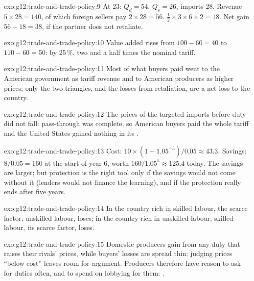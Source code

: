 \begin{solution}{exo:g12:trade-and-trade-policy:9}
At 23: $Q_d = 54$, $Q_s = 26$, imports 28. Revenue $5 \times 28 = 140$, of which foreign sellers pay $2 \times 28 = 56$.  $\tfrac12 \times 3 \times 6 \times 2 = 18$.
Net gain $56 - 18 = 38$, if the partner does not retaliate.
\end{solution}

\begin{solution}{exo:g12:trade-and-trade-policy:10}
Value added rises from $100 - 60 = 40$ to $110 - 60 = 50$: by 25\,\%, two and a half times the nominal tariff.
\end{solution}

\begin{solution}{exo:g12:trade-and-trade-policy:11}
Most of what buyers paid went to the American government as tariff revenue and to American producers as higher prices; only the two triangles, and the losses from
retaliation, are a net loss to the country.
\end{solution}

\begin{solution}{exo:g12:trade-and-trade-policy:12}
The prices of the targeted imports before duty did not fall: pass-through was complete, so American buyers paid the whole tariff and the United States gained nothing in its
.
\end{solution}

\begin{solution}{exo:g12:trade-and-trade-policy:13}
Cost: $10 \times (1 - 1.05^{-5})/0.05 \approx 43.3$. Savings: $8/0.05 = 160$ at the start of year 6, worth $160/1.05^5 \approx 125.4$ today. The savings are larger; but protection is the
right tool only if the savings would not come without it (lenders would not finance the learning), and if the protection really ends after five years.
\end{solution}

\begin{solution}{exo:g12:trade-and-trade-policy:14}
In the country rich in skilled labour, the scarce factor, unskilled labour, loses; in the country rich in unskilled labour, skilled labour, its scarce factor, loses.
\end{solution}

\begin{solution}{exo:g12:trade-and-trade-policy:15}
Domestic producers gain from any duty that raises their rivals' prices, while buyers' losses are spread thin; judging prices ``below cost'' leaves room for argument. Producers
therefore have reason to ask for duties often, and to spend on lobbying for them: .
\end{solution}

